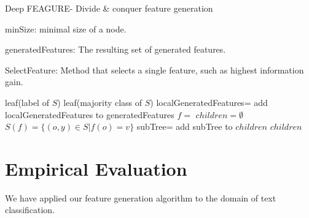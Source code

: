 \documentclass[twoside,11pt]{article}
\theoremstyle{definition}
\begin{document}
\begin{algorithm}[H]
	\caption{Deep FEAGURE- Divide \& conquer feature generation}
	\label{code-tree-thing}
	\small
	minSize: minimal size of a node.
	
	generatedFeatures: The resulting set of generated features.
	
	SelectFeature: Method that selects a single feature, such as highest information gain.
	
	\begin{algorithmic}
		\State 
		\Return leaf(label of $S$)
		\EndIf
		\State 
		\Return leaf(majority class of $S$)
		\EndIf
		\State localGeneratedFeatures=
		\State add localGeneratedFeatures to generatedFeatures
		\State $f=$ 
		\State $children=\emptyset$
			\State $S(f)=\{(o,y)\in S|f(o)=v\}$
			\State subTree= 
			\State add subTree to $children$
		\EndFor
		\State \Return $children$
		\EndFunction
		
	\end{algorithmic}
\end{algorithm}




\section{Empirical Evaluation}
We have applied our feature generation algorithm to the domain of text classification. %
\end{document}
